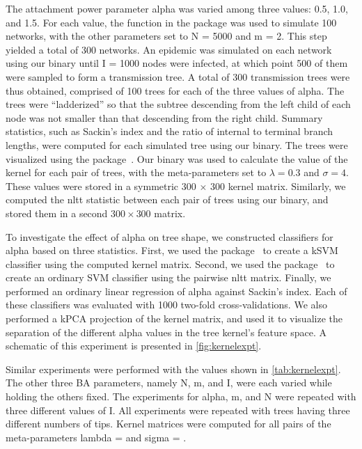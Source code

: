 The attachment power parameter \gls{alpha} was varied among three values: 0.5,
1.0, and 1.5. For each value, the  function in the
 package was used to simulate 100 networks, with the other
parameters set to \gls{N} = 5000 and \gls{m} = 2. This step yielded a total of
300 networks. An epidemic was simulated on each network using our
 binary until \gls{I} = 1000 nodes were infected, at which
point 500 of them were sampled to form a transmission tree. A total of 300
transmission trees were thus obtained, comprised of 100 trees for each of the
three values of \gls{alpha}. The trees were ``ladderized'' so that the subtree
descending from the left child of each node was not smaller than that
descending from the right child. Summary statistics, such as Sackin's index and
the ratio of internal to terminal branch lengths, were computed for each
simulated tree using our  binary. The trees were visualized
using the  package~\autocite{paradis2004ape}. Our
 binary was used to calculate the value of the kernel for
each pair of trees, with the meta-parameters set to $\lambda = 0.3$ and $\sigma
= 4$. These values were stored in a symmetric 300 $\times$ 300 kernel matrix.
Similarly, we computed the \gls{nltt} statistic between each pair of trees
using our  binary, and stored them in a second $300 \times
300$ matrix.

To investigate the effect of \gls{alpha} on tree shape, we constructed
classifiers for \gls{alpha} based on three statistics. First, we used the
 package~\autocite{zeileis2004kernlab} to create a \gls{kSVM}
classifier using the computed kernel matrix. Second, we used the
 package~\autocite{meyer2015e1071} to create an ordinary
\gls{SVM} classifier using the pairwise \gls{nltt} matrix. Finally, we
performed an ordinary linear regression of \gls{alpha} against Sackin's index.
Each of these classifiers was evaluated with 1000 two-fold cross-validations.
We also performed a \gls{kPCA} projection of the kernel matrix, and used it to
visualize the separation of the different \gls{alpha} values in the tree
kernel's feature space. A schematic of this experiment is presented in
\cref{fig:kernelexpt}.

Similar experiments were performed with the values shown in
\cref{tab:kernelexpt}. The other three \gls{BA} parameters, namely \gls{N},
\gls{m}, and \gls{I}, were each varied while holding the others fixed. The
experiments for \gls{alpha}, \gls{m}, and \gls{N} were repeated with three
different values of \gls{I}. All experiments were repeated with trees having
three different numbers of tips. Kernel matrices were computed for all pairs of
the meta-parameters \gls{lambda} =  and \gls{sigma} =
.

